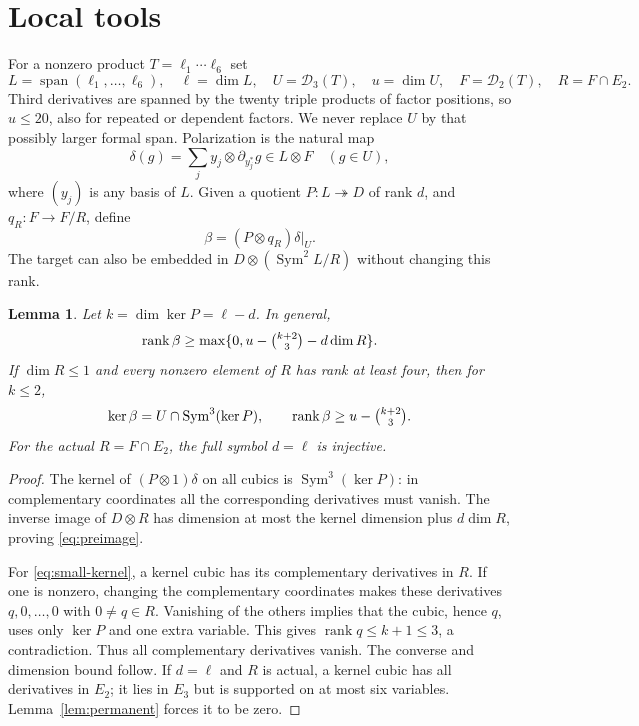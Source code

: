 \documentclass[11pt]{amsart}
\newtheorem{lemma}[theorem]{Lemma}
\theoremstyle{remark}\newtheorem{remark}[theorem]{Remark}
\numberwithin{equation}{section}
\newcommand{\Sym}{\operatorname{Sym}}
\newcommand{\Span}{\operatorname{span}}
\newcommand{\rank}{\operatorname{rank}}
\newcommand{\cD}{\mathcal D}
\newcommand{\dd}{\partial}
\begin{document}
\section{Local tools}
For a nonzero product $T=\ell_1\cdots\ell_6$ set
\[
 L=\Span(\ell_1,\ldots,\ell_6),\quad \ell=\dim L,\quad
 U=\cD_3(T),\quad u=\dim U,\quad F=\cD_2(T),\quad R=F\cap E_2.
\]
Third derivatives are spanned by the twenty triple products of factor
positions, so $u\le20$, also for repeated or dependent factors. We never
replace $U$ by that possibly larger formal span.
Polarization is the natural map
\[
 \delta(g)=\sum_j y_j\otimes\dd_{y_j^*}g\in L\otimes F
 \quad(g\in U),
\]
where $(y_j)$ is any basis of $L$. Given a quotient $P:L\twoheadrightarrow D$
of rank $d$, and $q_R:F\to F/R$, define
\[
 \beta=(P\otimes q_R)\delta|_U.
\]
The target can also be embedded in $D\otimes(\Sym^2L/R)$ without changing
this rank.

\begin{lemma}\label{lem:kernels}
Let $k=\dim\ker P=\ell-d$. In general,
\begin{equation}\label{eq:preimage}
 \rank\beta\ge\max\{0,u-\tbinom{k+2}{3}-d\dim R\}.
\end{equation}
If $\dim R\le1$ and every nonzero element of $R$ has rank at least four,
then for $k\le2$,
\begin{equation}\label{eq:small-kernel}
 \ker\beta=U\cap\Sym^3(\ker P),\qquad
 \rank\beta\ge u-\tbinom{k+2}{3}.
\end{equation}
For the actual $R=F\cap E_2$, the full symbol $d=\ell$ is injective.
\end{lemma}
\begin{proof}
The kernel of $(P\otimes1)\delta$ on all cubics is $\Sym^3(\ker P)$:
in complementary coordinates all the corresponding derivatives must vanish.
The inverse image of $D\otimes R$ has dimension at most the kernel
dimension plus $d\dim R$, proving \eqref{eq:preimage}.

For \eqref{eq:small-kernel}, a kernel cubic has its complementary derivatives
in $R$. If one is nonzero, changing the complementary coordinates makes
these derivatives $q,0,\ldots,0$ with $0\ne q\in R$. Vanishing of the
others implies that the cubic, hence $q$, uses only $\ker P$ and one extra
variable. This gives $\rank q\le k+1\le3$, a contradiction. Thus all
complementary derivatives vanish. The converse and dimension bound follow.
If $d=\ell$ and $R$ is actual, a kernel cubic has all derivatives in $E_2$;
it lies in $E_3$ but is supported on at most six variables. Lemma~\ref{lem:permanent}
forces it to be zero.
\end{proof}
\end{document}
